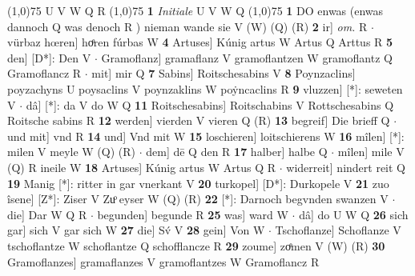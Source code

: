 \documentclass[8pt,a4paper,notitlepage]{article}
\begin{document}
\begin{table}[ht]
\begin{minipage}[t]{0.5\linewidth}
\begin{tabular}{rl}
\end{tabular}
\scriptsize
\line(1,0){75} \newline
U V W Q R \newline
\line(1,0){75} \newline
\textbf{1} \textit{Initiale} U V W Q  \newline
\line(1,0){75} \newline
\textbf{1} DO enwas (enwas dannoch Q was denoch R ) nieman wande sie V (W) (Q) (R) \textbf{2} ir] \textit{om.} R  $\cdot$ vürbaz hœren] hoͤren fúrbas W \textbf{4} Artuses] Kúnig artus W Artus Q Arttus R \textbf{5} den] [D*]: Den V  $\cdot$ Gramoflanz] gramaflanz V gramoflantzen W gramoflantz Q Gramoflancz R  $\cdot$ mit] mir Q \textbf{7} Sabins] Roitschesabins V \textbf{8} Poynzaclins] poyzachyns U poysaclins V poynzaklins W poẏncaclins R \textbf{9} vluzzen] [*]: seweten V  $\cdot$ dâ] [*]: da V do W Q \textbf{11} Roitschesabins] Roitschabins V Rottschesabins Q Roitsche sabins R \textbf{12} werden] vierden V vieren Q (R) \textbf{13} begreif] Die brieff Q  $\cdot$ und mit] vnd R \textbf{14} und] Vnd mit W \textbf{15} loschieren] loitschierens W \textbf{16} mîlen] [*]: milen V meyle W (Q) (R)  $\cdot$ dem] dē Q den R \textbf{17} halber] halbe Q  $\cdot$ mîlen] mile V (Q) R ineile W \textbf{18} Artuses] Kúnig artus W Artus Q R  $\cdot$ widerreit] nindert reit Q \textbf{19} Manig [*]: ritter in gar vnerkant V \textbf{20} turkopel] [D*]: Durkopele V \textbf{21} zuo îsene] [Z*]: Ziser V Zuͦ eyser W (Q) (R) \textbf{22} [*]: Darnoch begvnden swanzen V  $\cdot$ die] Dar W Q R  $\cdot$ begunden] begunde R \textbf{25} was] ward W  $\cdot$ dâ] do U W Q \textbf{26} sich gar] sich V gar sich W \textbf{27} die] Sv́ V \textbf{28} gein] Von W  $\cdot$ Tschoflanze] Schoflanze V tschoflantze W schoflantze Q schofflancze R \textbf{29} zoume] zoͤmen V (W) (R) \textbf{30} Gramoflanzes] gramaflanzes V gramoflantzes W Gramoflancz R \newline
\end{minipage}
\end{table}
\end{document}
